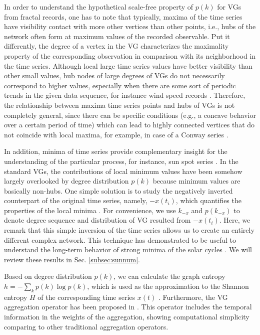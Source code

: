 		In order to understand the hypothetical scale-free property of $p(k)$ for VGs from fractal records, one has to note that typically, maxima of the time series have visibility contact with more other vertices than other points, i.e., hubs of the network often form at maximum values of the recorded observable. Put it differently, the degree of a vertex in the VG characterizes the maximality property of the corresponding observation in comparison with its neighborhood in the time series. Although local large time series values have better visibility than other small values, hub nodes of large degrees of VGs do not necessarily correspond to higher values, especially when there are some sort of periodic trends in the given data sequence, for instance wind speed records \cite{Pierini2012,Zou2014a}. Therefore, the relationship between maxima time series points and hubs of VGs is not completely general, since there can be specific conditions (e.g., a concave behavior over a certain period of time) which can lead to highly connected vertices that do not coincide with local maxima, for example, in case of a Conway series \cite{Lacasa2008}. 
				
		In addition, minima of time series provide complementary insight for the understanding of the particular process, for instance, sun spot series \cite{Zou2014a}. In the standard VGs, the contributions of local minimum values have been somehow largely overlooked by degree distribution $p(k)$ because minimum values are basically non-hubs. One simple solution is to study the negatively inverted counterpart of the original time series, namely, $-x(t_i)$, which quantifies the properties of the local minima \cite{Zou2014a}. For convenience, we use $k_{-x}$ and $p(k_{-x})$ to denote degree sequence and distribution of VG resulted from $-x(t_i)$. Here, we remark that this simple inversion of the time series allows us to create an entirely different complex network. This technique has demonstrated to be useful to understand the long-term behavior of strong minima of the solar cycles \cite{Zou2014a}. We will review these results in Sec. \ref{subsec:sunnum}. 
		
		Based on degree distribution $p(k)$, we can calculate the graph entropy $h = - \sum_{k} p(k) \log p(k)$, which is used as the approximation to the Shannon entropy $H$ of the corresponding time series $x(t)$ \cite{Luque2016,Goncalves2016}. Furthermore, the VG aggregation operator has been proposed in \cite{Chen2014,Jiang2016}. This operator includes the temporal information in the weights of the aggregation, showing computational simplicity comparing to other traditional aggregation operators.  
					

